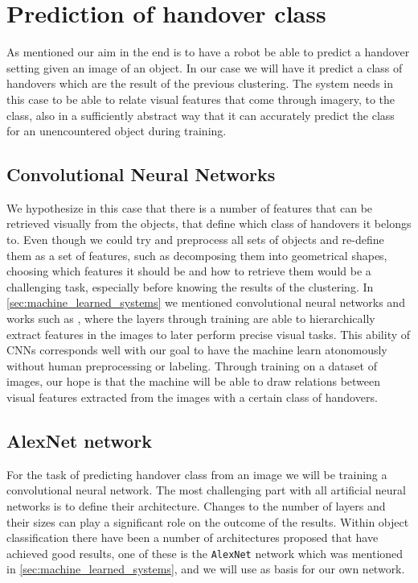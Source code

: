 %
%


\section{Prediction of handover class}

As mentioned our aim in the end is to have a robot be able to predict a handover setting given an image of an object. In our case we will have it predict a class of handovers which are the result of the previous clustering. The system needs in this case to be able to relate visual features that come through imagery, to the class, also in a sufficiently abstract way that it can accurately predict the class for an unencountered object during training.

\subsection{Convolutional Neural Networks}

We hypothesize in this case that there is a number of features that can be retrieved visually from the objects, that define which class of handovers it belongs to. Even though we could try and preprocess all sets of objects and re-define them as a set of features, such as decomposing them into geometrical shapes, choosing which features it should be and how to retrieve them would be a challenging task, especially before knowing the results of the clustering. In \ref{sec:machine_learned_systems} we mentioned convolutional neural networks and works such as \parencite{Lee2009}, \parencite{Turaga2010} where the layers through training are able to hierarchically extract features in the images to later perform precise visual tasks. This ability of CNNs corresponds well with our goal to have the machine learn atonomously without human preprocessing or labeling. Through training on a dataset of images, our hope is that the machine will be able to draw relations between visual features extracted from the images with a certain class of handovers.

\subsection{AlexNet network}

For the task of predicting handover class from an image we will be training a convolutional neural network. The most challenging part with all artificial neural networks is to define their architecture. Changes to the number of layers and their sizes can play a significant role on the outcome of the results. Within object classification there have been a number of architectures proposed that have achieved good results, one of these is the \texttt{AlexNet} network which was mentioned in \ref{sec:machine_learned_systems}, and we will use as basis for our own network.

